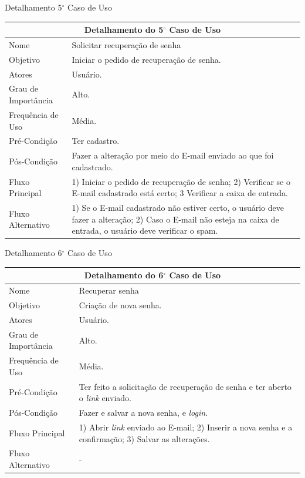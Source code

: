 \begin{apendicesenv}
\begin{quadro}[!htbp]
\caption[Detalhamento 5$^\circ$ Caso de Uso]{Detalhamento 5$^\circ$ Caso de Uso}
\begin{tabular}{|p{4cm}|p{9.95cm}|}
\hline
\multicolumn{2}{|c|}{Detalhamento do 5$^\circ$ Caso de Uso}\\ 
\hline
Nome & Solicitar recuperação de senha \\
\hline
Objetivo & Iniciar o pedido de recuperação de senha. \\
\hline
Atores & Usuário. \\
\hline
Grau de Importância & Alto. \\
\hline
Frequência de Uso & Média. \\
\hline
Pré-Condição & Ter cadastro. \\
\hline
Pós-Condição & Fazer a alteração por meio do \gls{E-mail} enviado ao que foi cadastrado. \\
\hline
Fluxo Principal & 1) Iniciar o pedido de recuperação de senha; 2) Verificar se o \gls{E-mail} cadastrado está certo; 3 Verificar a caixa de entrada.\\
\hline
Fluxo Alternativo & 1) Se o \gls{E-mail} cadastrado não estiver certo, o usuário deve fazer a alteração; 2) Caso o \gls{E-mail} não esteja na caixa de entrada, o usuário deve verificar o spam. \\
\hline
\end{tabular}
\end{quadro}

\begin{quadro}[!htbp]
\caption[Detalhamento 6$^\circ$ Caso de Uso]{Detalhamento 6$^\circ$ Caso de Uso}
\begin{tabular}{|p{4cm}|p{9.95cm}|}
\hline
\multicolumn{2}{|c|}{Detalhamento do 6$^\circ$ Caso de Uso}\\ 
\hline
Nome & Recuperar senha \\
\hline
Objetivo & Criação de nova senha. \\
\hline
Atores & Usuário. \\
\hline
Grau de Importância & Alto. \\
\hline
Frequência de Uso & Média. \\
\hline
Pré-Condição & Ter feito a solicitação de recuperação de senha e ter aberto o \textit{link} enviado. \\
\hline
Pós-Condição & Fazer e salvar a nova senha, e \textit{login}.\\
\hline
Fluxo Principal & 1) Abrir \textit{link} enviado ao \gls{E-mail}; 2) Inserir a nova senha e a confirmação; 3) Salvar as alterações. \\
\hline
Fluxo Alternativo & - \\
\hline
\end{tabular}
\end{quadro}


\end{apendicesenv}

